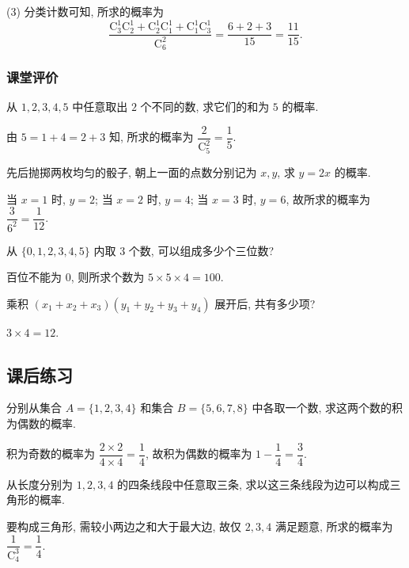     (3) 分类计数可知, 所求的概率为
    \[\frac{\mathrm{C}_3^1\mathrm{C}_2^1+ \mathrm{C}_2^1\mathrm{C}_1^1+ \mathrm{C}_1^1\mathrm{C}_3^1}{\mathrm{C}_6^2}
    = \frac{6+2+3}{15}= \frac{11}{15}.\]
\endsolution

\subsubsection{课堂评价}
\begin{exercise}
    从 $1,2,3,4,5$ 中任意取出 $2$ 个不同的数, 求它们的和为 $5$ 的概率.
\end{exercise}
\beginsolution
    由 $5= 1+4= 2+3$ 知, 所求的概率为 $\dfrac2{\mathrm{C}_5^2}= \dfrac15$.
\endsolution

\begin{exercise}
    先后抛掷两枚均匀的骰子, 朝上一面的点数分别记为 $x,y$, 求 $y=2x$ 的概率.
\end{exercise}
\beginsolution
    当 $x=1$ 时, $y=2$; 当 $x=2$ 时, $y=4$; 当 $x=3$ 时, $y=6$, 故所求的概率为 $\dfrac3{6^2}= \dfrac1{12}$.
\endsolution

\begin{exercise}
    从 $\{0,1,2,3,4,5\}$ 内取 $3$ 个数, 可以组成多少个三位数?
\end{exercise}
\beginsolution
    百位不能为 $0$, 则所求个数为 $5\times 5\times 4= 100$.
\endsolution

\begin{exercise}
    乘积 $(x_1+x_2+x_3)(y_1+y_2+y_3+y_4)$ 展开后, 共有多少项?
\end{exercise}
\beginsolution
    $3\times 4= 12$.
\endsolution

\subsection{课后练习}
\begin{exercise}
    分别从集合 $A=\{1, 2, 3, 4\}$ 和集合 $B=\{5, 6, 7, 8\}$ 中各取一个数, 求这两个数的积为偶数的概率.
\end{exercise}
\beginsolution
    积为奇数的概率为 $\dfrac{2\times 2}{4\times 4}= \dfrac14$, 故积为偶数的概率为 $1-\dfrac14= \dfrac34$.
\endsolution

\begin{exercise}
    从长度分别为 $1, 2, 3, 4$ 的四条线段中任意取三条, 求以这三条线段为边可以构成三角形的概率.
\end{exercise}
\beginsolution
    要构成三角形, 需较小两边之和大于最大边, 故仅 $2,3,4$ 满足题意, 所求的概率为 $\dfrac1{\mathrm{C}_4^3}= \dfrac14$.
\endsolution


